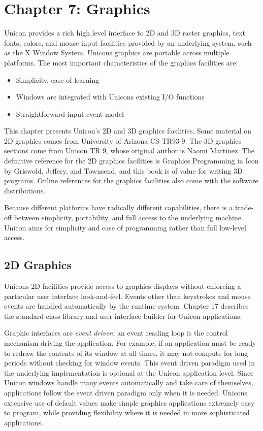 \clearpage\section{Chapter 7: Graphics}

Unicon provides a rich high level interface to 2D and 3D raster
graphics, text fonts, colors, and mouse input facilities provided by an
underlying system, such as the X Window System.
Unicon{\textquotesingle}s graphics are portable across multiple
platforms. The most important characteristics of the graphics
facilities are:

\begin{itemize}\itemsep0pt
\item Simplicity, ease of learning
\item Windows are integrated with Unicon{\textquotesingle}s existing I/O
functions
\item Straightforward input event model
\end{itemize}
This chapter presents Unicon's 2D and 3D graphics facilities.
Some material on 2D graphics
comes from University of Arizona CS TR93-9. The 3D graphics sections
come from Unicon TR 9, whose original author is Naomi Martinez. The
definitive reference for the 2D
graphics facilities is {\textquotedbl}Graphics Programming in
Icon{\textquotedbl} by Griswold, Jeffery, and Townsend, and this book
is of value for writing 3D programs. Online references
for the graphics facilities also come with the software distributions.

Because different platforms have radically different capabilities, there
is a trade-off between simplicity, portability, and full access to the
underlying machine. Unicon aims for simplicity and ease of programming
rather than full low-level access.

\subsection{2D Graphics}

Unicon{\textquotesingle}s 2D facilities provide access to graphics
displays without enforcing a particular user interface look-and-feel.
Events other than keystrokes and mouse events are handled automatically
by the runtime system. Chapter 17 describes the standard class library
and user interface builder for Unicon applications.

Graphic interfaces are \textit{event driven}; an
event reading loop is the control mechanism driving the application.
For example, if an application must be ready to redraw the contents
of its window at all times, it may not compute for long periods without
checking for window events. This event driven paradigm used in the
underlying implementation is optional at the Unicon application
level. Since Unicon windows handle many events automatically and
{\textquotedbl}take care of themselves{\textquotedbl}, applications
follow the event driven paradigm only when it is needed.
Unicon{\textquotesingle}s extensive
use of default values make simple graphics applications extremely easy
to program, while providing flexibility where it is needed in more
sophisticated applications.

